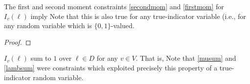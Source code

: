 \begin{theorem}
The first and second moment constraints \ref{secondmom} and \ref{firstmom} for $I_v(\ell)$ imply 
Note that this is also true for any true-indicator variable (i.e., for any random variable which is $\{ 0, 1\}$-valued.
\end{theorem}
\begin{proof}
\end{proof}
\begin{theorem}
$I_v(\ell)$ sum to $1$ over $\ell \in D$ for any $v \in V$. That is,
 Note that \ref{musum} and \ref{lambsum} were constraints which exploited precisely this property of a true-indicator random variable. 
\end{theorem}
